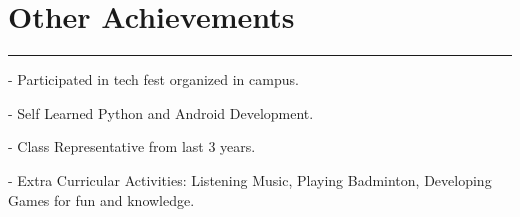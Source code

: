 \documentclass[]{sapna-resume}
\begin{document}
\begin{minipage}[t]{0.66\textwidth}
\section{Other Achievements} 
\noindent\rule{12.5cm}{0.4pt}
\hspace{5em}%
\begin{minipage}{0.85\textwidth\vspace{2pt}}
- Participated in tech fest organized in campus.
\end{minipage}
\begin{minipage}{0.85\textwidth\vspace{2pt}}
- Self Learned Python and Android Development. 
\end{minipage}
\begin{minipage}{0.85\textwidth\vspace{2pt}}
- Class Representative from last 3 years. 
\end{minipage}
\begin{minipage}{0.85\textwidth\vspace{2pt}}
- Extra Curricular Activities: Listening Music, Playing Badminton, Developing Games for fun and knowledge.
\end{minipage}
    
\end{minipage} 
\end{document}
